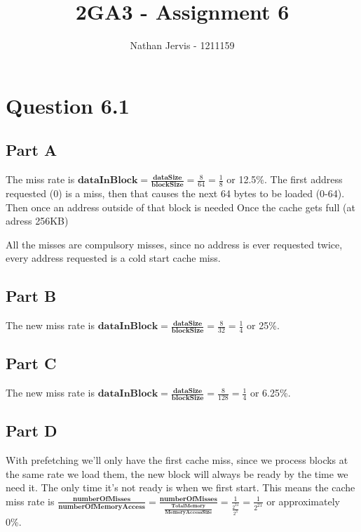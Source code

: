 \documentclass[11pt]{article} %
\title{2GA3 - Assignment 6}
\author{Nathan Jervis - 1211159}
\begin{document}
\maketitle

\section{Question 6.1}

\subsection{Part A}

The miss rate is $\textbf{dataInBlock} = \frac{\textbf{dataSize}}{\textbf{blockSize}} = \frac{8}{64} = \frac{1}{8}$ or 12.5\%. The first address requested (0) is a miss, then that causes the next 64 bytes to be loaded (0-64). Then once an address outside of that block is needed Once the cache gets full (at adress 256KB)

All the misses are compulsory misses, since no address is ever requested twice, every address requested is a cold start cache miss.

\subsection{Part B}

The new miss rate is $\textbf{dataInBlock} = \frac{\textbf{dataSize}}{\textbf{blockSize}} = \frac{8}{32} = \frac{1}{4}$ or 25\%.

\subsection{Part C}

The new miss rate is $\textbf{dataInBlock} = \frac{\textbf{dataSize}}{\textbf{blockSize}} = \frac{8}{128} = \frac{1}{4}$ or 6.25\%.

\subsection{Part D}

With prefetching we'll only have the first cache miss, since we process blocks at the same rate we load them, the new block will always be ready by the time we need it. The only time it's not ready is when we first start. This means the cache miss rate is $\frac{\textbf{numberOfMisses}}{\textbf{numberOfMemoryAccess}} = \frac{\textbf{numberOfMisses}}{\frac{\textbf{TotalMemory}}{\textbf{MemoryAccessSize}}} = \frac{1}{\frac{2^{24}}{2^{3}}} = \frac{1}{2^{21}}$ or approximately 0\%.
\end{document}
